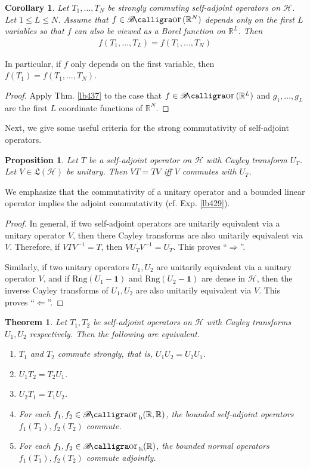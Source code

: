 \documentclass[12pt,b5paper,notitlepage]{article}
\theoremstyle{definition}
\theoremstyle{plain}
\newtheorem{thm}[df]{Theorem}
\newtheorem{pp}[df]{Proposition}
\newtheorem{co}[df]{Corollary}
\DeclareMathOperator{\Bor}{\mathscr{B}\text{\kern -2pt {\calligra\large or}}\,}
\DeclareMathOperator{\Borb}{{\mathscr{B}\text{\kern -2pt {\calligra\large or}}\,}_{\mathrm b}}
\newcommand{\fk}{\mathfrak}
\newcommand{\idt}{\mathbf{1}}
\newcommand{\Rbb}{\mathbb R}
\newcommand{\Rng}{\mathrm{Rng}}
\newcommand{\MH}{\mathcal H}
\numberwithin{equation}{section}
\begin{document}
\begin{co}\label{lb439}
Let $T_1,\dots,T_N$ be strongly commuting self-adjoint operators on $\MH$. Let $1\leq L\leq N$. Assume that $f\in\Bor(\Rbb^N)$ depends only on the first $L$ variables so that $f$ can also be viewed as a Borel function on $\Rbb^L$. Then
\begin{align*}
f(T_1,\dots,T_L)=f(T_1,\dots,T_N)
\end{align*} 
\end{co}

In particular, if $f$ only depends on the first variable, then $f(T_1)=f(T_1,\dots,T_N)$.

\begin{proof}
Apply Thm. \ref{lb437} to the case that $f\in\Bor(\Rbb^L)$ and $g_1,\dots,g_L$ are the first $L$ coordinate functions of $\Rbb^N$.
\end{proof}

Next, we give some useful criteria for the strong commutativity of self-adjoint operators.

\begin{pp}\label{lb438}
Let $T$ be a self-adjoint operator on $\MH$ with Cayley transform $U_T$. Let $V\in\fk L(\MH)$ be unitary. Then $VT=TV$ iff $V$ commutes with $U_T$.
\end{pp}

We emphasize that the commutativity of a unitary operator and a bounded linear operator implies the adjoint commutativity (cf. Exp. \ref{lb429}).

\begin{proof}
In general, if two self-adjoint operators are unitarily equivalent via a unitary operator $V$, then there Cayley transforms are also unitarily equivalent via $V$. Therefore, if $VTV^{-1}=T$, then $VU_TV^{-1}=U_T$. This proves ``$\Rightarrow$''.

Similarly, if two unitary operators $U_1,U_2$ are unitarily equivalent via a unitary operator $V$, and if $\Rng(U_1-\idt)$ and $\Rng(U_2-\idt)$ are dense in $\MH$, then the inverse Cayley transforms of $U_1,U_2$ are also unitarily equivalent via $V$. This proves ``$\Leftarrow$''.
\end{proof}



\begin{thm}\label{lb489}
Let $T_1,T_2$ be self-adjoint operators on $\MH$ with Cayley transforms $U_1,U_2$ respectively. Then the following are equivalent.
\begin{enumerate}[label=(\arabic*)]
\item $T_1$ and $T_2$ commute strongly, that is, $U_1U_2=U_2U_1$.
\item $U_1T_2=T_2U_1$.
\item $U_2T_1=T_1U_2$.
\item For each $f_1,f_2\in\Borb(\Rbb,\Rbb)$, the bounded self-adjoint operators $f_1(T_1),f_2(T_2)$ commute.
\item For each $f_1,f_2\in\Borb(\Rbb)$, the bounded normal operators $f_1(T_1),f_2(T_2)$ commute adjointly.
\end{enumerate}
\end{thm}
\end{document}
